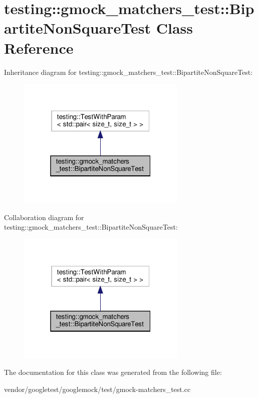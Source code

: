 \hypertarget{classtesting_1_1gmock__matchers__test_1_1_bipartite_non_square_test}{}\section{testing\+:\+:gmock\+\_\+matchers\+\_\+test\+:\+:Bipartite\+Non\+Square\+Test Class Reference}
\label{classtesting_1_1gmock__matchers__test_1_1_bipartite_non_square_test}


Inheritance diagram for testing\+:\+:gmock\+\_\+matchers\+\_\+test\+:\+:Bipartite\+Non\+Square\+Test\+:
\nopagebreak
\begin{figure}[H]
\begin{center}
\leavevmode
\includegraphics[width=229pt]{classtesting_1_1gmock__matchers__test_1_1_bipartite_non_square_test__inherit__graph}
\end{center}
\end{figure}


Collaboration diagram for testing\+:\+:gmock\+\_\+matchers\+\_\+test\+:\+:Bipartite\+Non\+Square\+Test\+:
\nopagebreak
\begin{figure}[H]
\begin{center}
\leavevmode
\includegraphics[width=229pt]{classtesting_1_1gmock__matchers__test_1_1_bipartite_non_square_test__coll__graph}
\end{center}
\end{figure}


The documentation for this class was generated from the following file\+:\begin{DoxyCompactItemize}
\item 
vendor/googletest/googlemock/test/gmock-\/matchers\+\_\+test.\+cc\end{DoxyCompactItemize}
